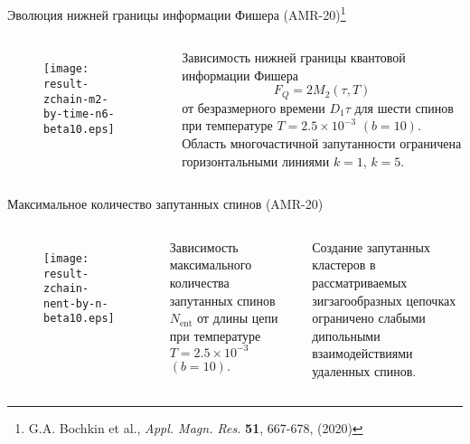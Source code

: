 \begin{frame}{Эволюция нижней границы информации Фишера (AMR-20)\footnote{G.A. Bochkin et al., \textit{Appl. Magn. Res.} \textbf{51}, 667-678, (2020)}}
\begin{columns}

    \begin{figure}
    \texttt{[image: result-zchain-m2-by-time-n6-beta10.eps]}
    \end{figure}

    Зависимость нижней границы квантовой информации Фишера
    $$ F_Q = 2M_2(\tau, T) $$
    от безразмерного времени $D_1 \tau$
    для шести спинов
    при температуре $T = 2.5 \times 10^{-3}$ $(b = 10)$.
    Область многочастичной запутанности ограничена горизонтальными линиями $k = 1$, $k = 5$.
\end{columns}
\end{frame}


\begin{frame}{Максимальное количество запутанных спинов (AMR-20)}
\begin{columns}

    \begin{figure}
    \texttt{[image: result-zchain-nent-by-n-beta10.eps]}
    \end{figure}

    Зависимость максимального количества запутанных спинов $N_\mathrm{ent}$ от длины цепи при температуре $T = 2.5 \times 10^{-3}$ $(b = 10)$.

    \vspace{0.5cm}

    \alert{Создание запутанных кластеров в рассматриваемых зигзагообразных цепочках ограничено слабыми дипольными взаимодействиями удаленных спинов}.
\end{columns}
\end{frame}


